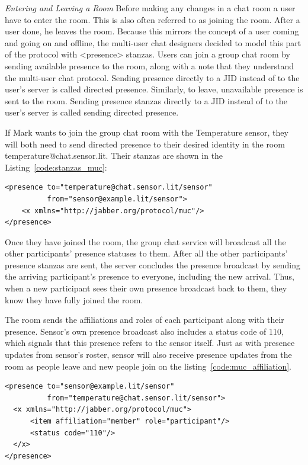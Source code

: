 \emph{Entering and Leaving a Room}
\newline
Before making any changes in a chat room a user have to enter the room. This is also often referred to as joining the room. After a user done, he leaves the room. Because this mirrors the concept of a user coming and going on and offline, the multi-user chat designers decided to model this part of the protocol with <presence> stanzas. Users can join a group chat room by sending available presence to the room, along with a note that they understand the multi-user chat protocol. Sending presence directly to a JID instead of to the user’s server is called directed presence. Similarly, to leave, unavailable presence is sent to the room. Sending presence stanzas directly to a JID instead of to the user’s server is called sending directed presence.

If Mark wants to join the group chat room with the Temperature sensor, they will both need to send directed presence to their desired identity in the room temperature@chat.sensor.lit. Their stanzas are shown in the Listing~\ref{code:stanzas_muc}:
\begin{lstlisting}[label=code:stanzas_muc,caption=Stanzas Format for MUC]
<presence to="temperature@chat.sensor.lit/sensor"
          from="sensor@example.lit/sensor">
    <x xmlns="http://jabber.org/protocol/muc"/>
</presence>
\end{lstlisting}

Once they have joined the room, the group chat service will broadcast all the other participants' presence statuses to them. After all the other participants’ presence stanzas are sent, the server concludes the presence broadcast by sending the arriving participant’s presence to everyone, including the new arrival. Thus, when a new participant sees their own presence broadcast back to them, they know they have fully joined the room.

The room sends the affiliations and roles of each participant along with their presence. Sensor's own presence broadcast also includes a status code of 110, which signals that this presence refers to the sensor itself. Just as with presence updates from sensor's roster, sensor will also receive presence updates from the room as people leave and new people join on the listing~\ref{code:muc_affiliation}.
\begin{lstlisting}[label=code:muc_affiliation,caption=Server Presence Notification]
<presence to="sensor@example.lit/sensor"
          from="temperature@chat.sensor.lit/sensor">
  <x xmlns="http://jabber.org/protocol/muc">
      <item affiliation="member" role="participant"/>
      <status code="110"/>
  </x>
</presence>
\end{lstlisting}

